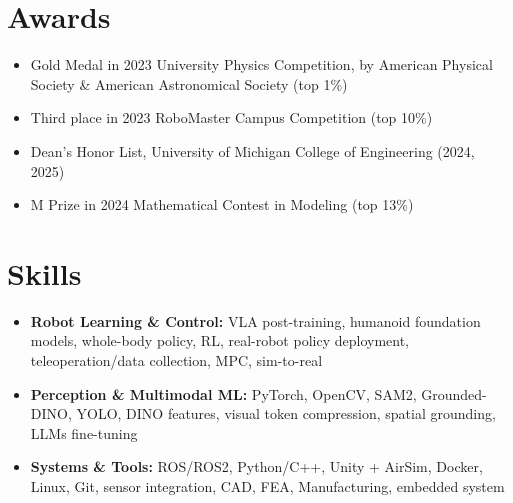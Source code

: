 \documentclass[11pt,letterpaper]{article}
\newcommand{\resumeItem}[1]{
    \item #1
}
\begin{document}
\section*{Awards}

\begin{itemize}
    \resumeItem{Gold Medal in 2023 University Physics Competition, by American Physical Society \& American Astronomical Society (top 1\%)}
    \resumeItem{Third place in 2023 RoboMaster Campus Competition (top 10\%)}
    \resumeItem{Dean's Honor List, University of Michigan College of Engineering (2024, 2025)}
    \resumeItem{M Prize in 2024 Mathematical Contest in Modeling (top 13\%)}
\end{itemize}

\section*{Skills}

\begin{itemize}
\resumeItem{\textbf{Robot Learning \& Control:} VLA post-training, humanoid foundation models, whole-body policy, RL, real-robot policy deployment, teleoperation/data collection, MPC, sim-to-real}
\resumeItem{\textbf{Perception \& Multimodal ML:} PyTorch, OpenCV, SAM2, Grounded-DINO, YOLO, DINO features, visual token compression, spatial grounding, LLMs fine-tuning}
\resumeItem{\textbf{Systems \& Tools:} ROS/ROS2, Python/C++, Unity + AirSim, Docker, Linux, Git, sensor integration, CAD, FEA, Manufacturing, embedded system}
\end{itemize}
\end{document}
